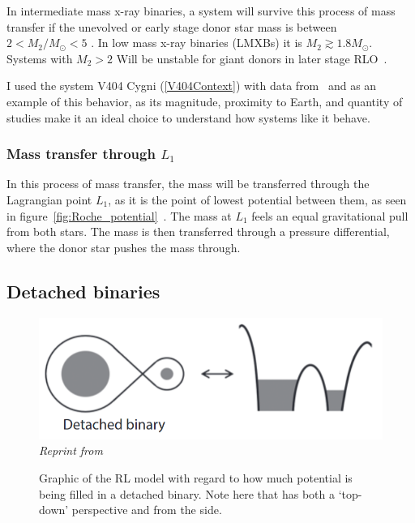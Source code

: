 \documentclass[12pt, a4paper]{article}
\begin{document}
        In intermediate mass x-ray binaries, a system will survive this process of mass transfer if the unevolved or early stage donor star mass is between $2 < M_2/M_\odot < 5$ \parencite{TaurisvandenHeuvel+2023}. In low mass x-ray binaries (LMXBs) it is $M_2 \gtrsim 1.8 M_\odot$. Systems with $M_2 > 2$ Will be unstable for giant donors in later stage RLO~\parencite{TaurisvandenHeuvel+2023}.
        
        I used the system V404 Cygni (\ref{V404Context}) with data from~\parencite{Bernardini_2016} and \parencite{Shahbaz_1994} as an example of this behavior, as its magnitude, proximity to Earth, and quantity of studies make it an ideal choice to understand how systems like it behave. 

        \subsubsection{Mass transfer through $L_1$} \label{L1MassTransfer}

        In this process of mass transfer, the mass will be transferred through the Lagrangian point $L_1$, as it is the point of lowest potential between them, as seen in figure~\ref{fig:Roche_potential}~\parencite{TaurisvandenHeuvel+2023}. The mass at $L_1$ feels an equal gravitational pull from both stars. The mass is then transferred through a pressure differential, where the donor star pushes the mass through. 

        \subsection{\centering Detached binaries}\label{DetachedBinary}

        \begin{figure}[H]
            \centering
            \includegraphics[scale = .4]{Figs/Detached binary.png}\\
            \textit{Reprint from~\parencite{TaurisvandenHeuvel+2023}}
            \caption{Graphic of the RL model with regard to how much potential is being filled in a detached binary. Note here that has both a `top-down' perspective and from the side.}
            \label{DetachedBinaryRL}
        \end{figure}
\end{document}
